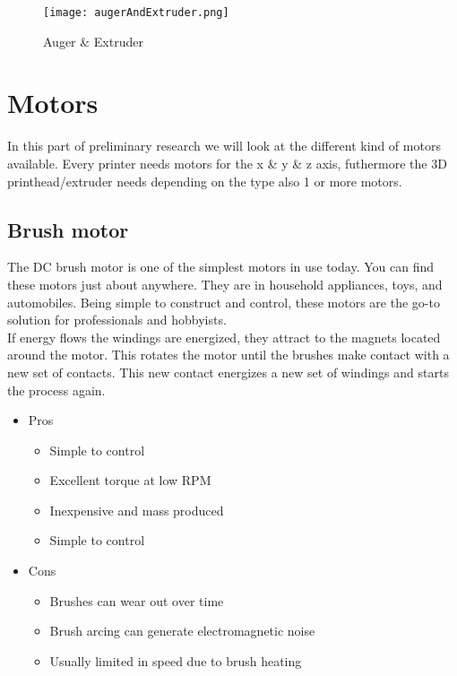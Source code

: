 \documentclass[11pt]{article}
\begin{document}
\begin{figure}[hbtp]
\caption{Auger \& Extruder}
\centering
\texttt{[image: augerAndExtruder.png]}
\end{figure}


 \newpage
 \section{Motors}
	In this part of preliminary research we will look at the different kind of motors available. Every printer needs motors for the x \& y \& z  axis, futhermore the 3D printhead/extruder needs depending on the type also 1 or more motors. \\
	
	\subsection{Brush motor}
 		The DC brush motor is one of the simplest motors in use today. You can find these motors just about anywhere. They are in household appliances, toys, and automobiles. Being simple to construct and control, these motors are the go-to solution for professionals and hobbyists.\\
 		
 		If energy flows the windings are energized, they attract to the magnets located around the motor. This rotates the motor until the brushes make contact with a new set of  contacts. This new contact energizes a new set of windings and starts the process again.
 		
\begin{itemize}		
\item Pros
\begin{itemize}
		\item Simple to control
		\item Excellent torque at low RPM
		\item Inexpensive and mass produced
		\item Simple to control
	\end{itemize}		
\end{itemize}	


 
\begin{itemize}		
\item Cons
\begin{itemize}
		\item Brushes can wear out over time
		\item Brush arcing can generate electromagnetic noise
		\item  Usually limited in speed due to brush heating
	
	\end{itemize}		
\end{itemize}		
\end{document}
